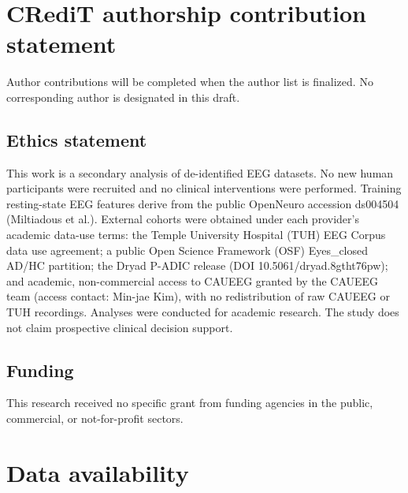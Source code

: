 \section*{CRediT authorship contribution statement}

Author contributions will be completed when the author list is finalized. No corresponding author is designated in this draft.



\subsection{Ethics statement}

This work is a secondary analysis of de-identified EEG datasets. No new human participants were recruited and no clinical interventions were performed. Training resting-state EEG features derive from the public OpenNeuro accession ds004504 (Miltiadous et al.). External cohorts were obtained under each provider's academic data-use terms: the Temple University Hospital (TUH) EEG Corpus data use agreement; a public Open Science Framework (OSF) Eyes\_closed AD/HC partition; the Dryad P-ADIC release (DOI 10.5061/dryad.8gtht76pw); and academic, non-commercial access to CAUEEG granted by the CAUEEG team (access contact: Min-jae Kim), with no redistribution of raw CAUEEG or TUH recordings. Analyses were conducted for academic research. The study does not claim prospective clinical decision support.



\subsection{Funding}

This research received no specific grant from funding agencies in the public, commercial, or not-for-profit sectors.



\section*{Data availability}

